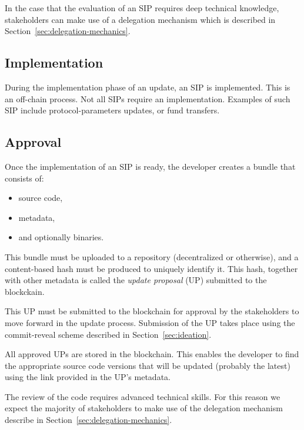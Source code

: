 \documentclass[11pt,a4paper]{article}
\begin{document}
In the case that the evaluation of an SIP requires deep technical knowledge,
stakeholders can make use of a delegation mechanism which is described in
Section~\ref{sec:delegation-mechanics}.

\subsection{Implementation}
\label{sec:implementation}

During the implementation phase of an update, an SIP is implemented. This is an
off-chain process. Not all SIPs require an implementation. Examples of such SIP
include protocol-parameters updates, or fund transfers.

\subsection{Approval}
\label{sec:approval}

Once the implementation of an SIP is ready, the developer creates a bundle that
consists of:
\begin{itemize}
\item source code,
\item metadata,
\item and optionally binaries.
\end{itemize}
This bundle must be uploaded to a repository (decentralized or otherwise), and a
content-based hash must be produced to uniquely identify it. This hash, together
with other metadata is called the \emph{update proposal} (UP)
submitted to the blockckain.

This UP must be submitted to the blockchain for approval by the stakeholders to
move forward in the update process. Submission of the UP takes place using the
commit-reveal scheme described in Section~\ref{sec:ideation}.


All approved UPs are stored in the blockchain. This enables the developer to
find the appropriate source code versions that will be updated (probably the
latest) using the link provided in the UP's metadata.

The review of the code requires advanced technical skills. For this reason we
expect the majority of stakeholders to make use of the delegation mechanism
describe in Section~\ref{sec:delegation-mechanics}.
\end{document}
